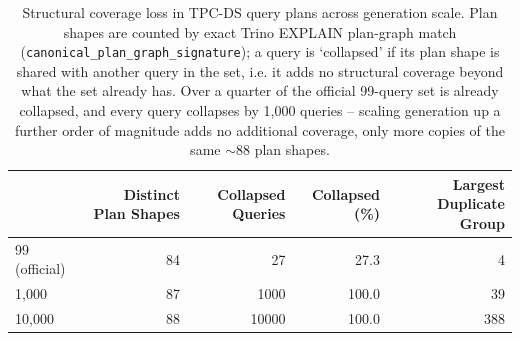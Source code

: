 \begin{table}
\caption{Structural coverage loss in TPC-DS query plans across generation scale. Plan shapes are counted by exact Trino EXPLAIN plan-graph match (\texttt{canonical\_plan\_graph\_signature}); a query is `collapsed' if its plan shape is shared with another query in the set, i.e. it adds no structural coverage beyond what the set already has. Over a quarter of the official 99-query set is already collapsed, and every query collapses by 1,000 queries -- scaling generation up a further order of magnitude adds no additional coverage, only more copies of the same $\sim$88 plan shapes.}
\label{tab:tpcds-structural-collapse}
\begin{tabular}{lrrrr}
\toprule
 & Distinct Plan Shapes & Collapsed Queries & Collapsed (\%) & Largest Duplicate Group \\
\midrule
99 (official) & 84 & 27 & 27.3 & 4 \\
1,000 & 87 & 1000 & 100.0 & 39 \\
10,000 & 88 & 10000 & 100.0 & 388 \\
\bottomrule
\end{tabular}
\end{table}
